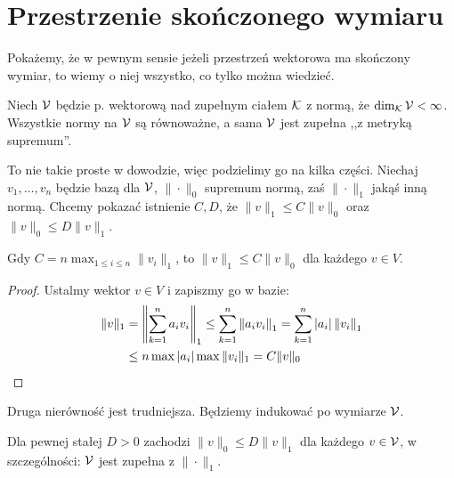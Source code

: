 \section{Przestrzenie skończonego wymiaru}
Pokażemy, że w pewnym sensie jeżeli przestrzeń wektorowa ma skończony wymiar, to wiemy o niej wszystko, co tylko można wiedzieć.

\begin{fakt}
	Niech $\mathcal V$ będzie p. wektorową nad zupełnym ciałem $\mathcal K$ z normą, że $\dim_\mathcal K \mathcal V < \infty$.
	Wszystkie normy na $\mathcal V$ są równoważne, a sama $ \mathcal V$ jest zupełna ,,z metryką supremum''.
\end{fakt}

To nie takie proste w dowodzie, więc podzielimy go na kilka części.
Niechaj $v_1, \dots, v_n$ będzie bazą dla $\mathcal V$, $\|\cdot\|_0$ supremum normą, zaś $\|\cdot\|_1$ jakąś inną normą.
Chcemy pokazać istnienie $C, D$, że $\|v\|_1 \le C \|v\|_0$ oraz $\|v\|_0 \le D \|v\|_1$.

\begin{lemat}
	Gdy $C = n \max_{1 \le i \le n} \|v_i\|_1$, to $\|v\|_1 \le C \| v \|_0$ dla każdego $v \in V$.
\end{lemat}

\begin{proof}
	Ustalmy wektor $v \in V$ i zapiszmy go w bazie:
	\begin{align*}
	\|v\|_1 & = \left\| \sum_{k=1}^n a_i v_i \right\|_1 \le  \sum_{k=1}^n \left\| a_i v_i \right\|_1 =  \sum_{k=1}^n |a_i|  \left\|  v_i \right\|_1 \\
	& \le n \max |a_i| \max \|v_i\|_1 = C \|v\|_0 \qedhere
	\end{align*}
\end{proof}

Druga nierówność jest trudniejsza.
Będziemy indukować po wymiarze $\mathcal V$.

\begin{lemat}
	Dla pewnej stałej $D > 0$ zachodzi $\|v\|_0 \le D \|v\|_1$ dla każdego $v \in \mathcal V$, w szczególności: $\mathcal V$ jest zupełna z $\|\cdot\|_1$.
\end{lemat}

